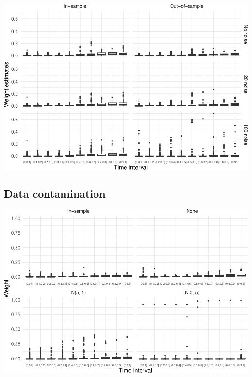 \documentclass[
]{article}
\begin{document}
\includegraphics{ProgressReport_files/figure-latex/boxp_wt_noise-1.pdf}

\subsection{Data contamination}\label{data-contamination-1}

\includegraphics{ProgressReport_files/figure-latex/boxp_wt_contam-1.pdf}
\end{document}
